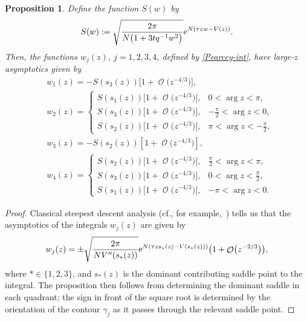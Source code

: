\documentclass[10pt,a4paper]{amsart}
\DeclareMathOperator{\OO}{\mathcal{O}}
\numberwithin{equation}{section}
\newtheorem{Proposition}[Theorem]{Proposition}
 { \theoremstyle{definition}
\newtheorem{Definition}[Theorem]{Definition}
\newtheorem{Note}[Theorem]{Note}
\newtheorem{Example}[Theorem]{Example}
\newtheorem{Remark}[Theorem]{Remark} }
\begin{document}
 \begin{Proposition}
 Define the function $S(w)$ by
 \begin{equation*}
 S(w) := \sqrt{\frac{2\pi}{N\bigl(1+3tq^{-1}w^2\bigr)}}{\rm e}^{N(\tau z w -V(z) )}.
 \end{equation*}
 Then, the functions $w_j(z)$, $j=1,2,3,4$, defined by \eqref{Pearcey-int}, have large-$z$ asymptotics given by
 \begin{align*}
 &w_1(z)= -S(s_3(z))\bigl[1 + \OO\bigl(z^{-4/3}\bigr)\bigr],\\
 &w_2(z)=
 \begin{cases}
 S(s_1(z))\bigl[1 + \OO\bigl(z^{-4/3}\bigr)\bigr], & 0 < \arg z < \pi,\\
 S(s_3(z))\bigl[1 + \OO\bigl(z^{-4/3}\bigr)\bigr], & -\frac{\pi}{2} < \arg z < 0,\\
 S(s_2(z))\bigl[1 + \OO\bigl(z^{-4/3}\bigr)\bigr], & \pi < \arg z < -\frac{\pi}{2},
 \end{cases}\\
 &w_3(z)= -S(s_2(z))[1 + \OO\bigl(z^{-4/3}\bigr)],\\
 &w_4(z)=
 \begin{cases}
 S(s_2(z))\bigl[1 + \OO\bigl(z^{-4/3}\bigr)\bigr], & \frac{\pi}{2} < \arg z < \pi,\\
 S(s_3(z))\bigl[1 + \OO\bigl(z^{-4/3}\bigr)\bigr], & 0 < \arg z < \frac{\pi}{2},\\
 S(s_1(z))\bigl[1 + \OO\bigl(z^{-4/3}\bigr)\bigr], & -\pi < \arg z < 0.
 \end{cases}
 \end{align*}
 \end{Proposition}
 \begin{proof}
 Classical steepest descent analysis (cf., for example,~\cite{Miller}) tells us that the asymptotics of the integrals $w_j(z)$ are given by
 \begin{equation*}
 w_j(z) = \pm \sqrt{\frac{2\pi}{NV''(s_*(z))}}{\rm e}^{N(\tau z s_{*}(z) -V(s_*(z)) )}\bigl(1 + \OO\bigl(z^{-2/3}\bigr)\bigr),
 \end{equation*}
 where $*\in\{1,2,3\}$, and $s_{*}(z)$ is the dominant contributing saddle point to the integral. The proposition then follows from determining the dominant saddle in each quadrant; the sign in front of the square root is determined by the orientation of the contour $\gamma_j$ as it passes through
 the relevant saddle point.
 \end{proof}
\end{document}

